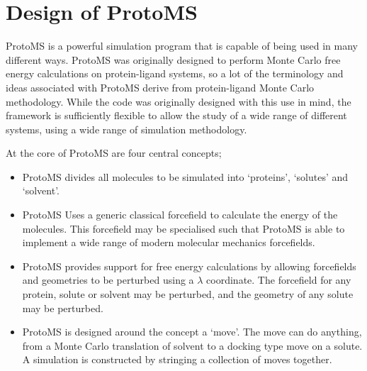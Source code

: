 \documentclass[letterpaper,10pt,english]{sphinxmanual}
\begin{document}
\chapter{Design of ProtoMS}
\label{\detokenize{protoms:design-of-protoms}}\label{\detokenize{protoms::doc}}
\ignorespaces 
ProtoMS is a powerful simulation program that is capable of being used in many different ways. ProtoMS was originally designed to perform Monte Carlo free energy calculations on protein-ligand systems, so a lot of the terminology and ideas associated with ProtoMS derive from protein-ligand Monte Carlo methodology. While the code was originally designed with this use in mind, the framework is sufficiently flexible to allow the study of a wide range of different systems, using a wide range of simulation methodology.

At the core of ProtoMS are four central concepts;
\begin{itemize}
\item {} 
 ProtoMS divides all molecules to be simulated into ‘proteins’, ‘solutes’ and ‘solvent’.

\item {} 
 ProtoMS Uses a generic classical forcefield to calculate the energy of the molecules. This forcefield may be specialised such that ProtoMS is able to implement a wide range of modern molecular mechanics forcefields.

\item {} 
 ProtoMS provides support for free energy calculations by allowing forcefields and geometries to be perturbed using a \(\lambda\) coordinate. The forcefield for any protein, solute or solvent may be perturbed, and the geometry of any solute may be perturbed.

\item {} 
 ProtoMS is designed around the concept a ‘move’. The move can do anything, from a Monte Carlo translation of solvent to a docking type move on a solute. A simulation is constructed by stringing a collection of moves together.

\end{itemize}
\end{document}
